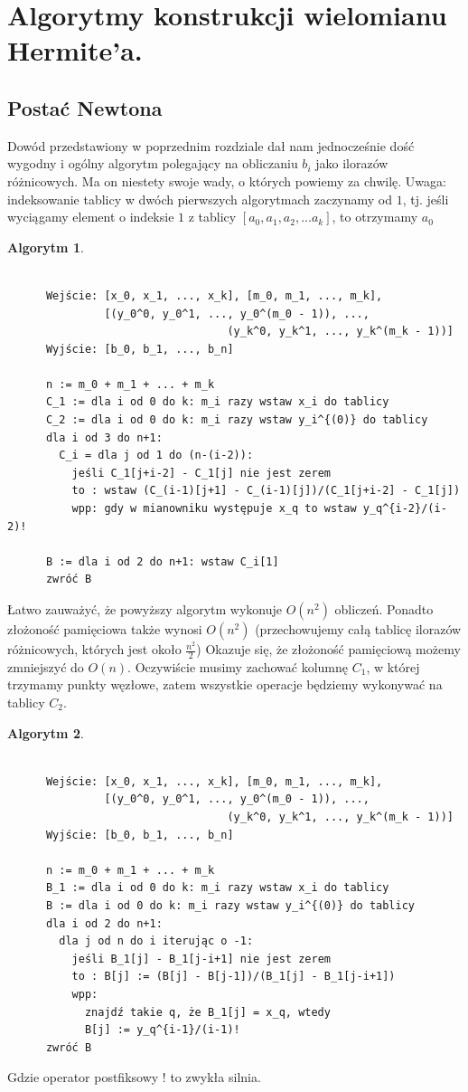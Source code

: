 \documentclass[10pt,wide]{mwart}
\theoremstyle{definition}
\newtheorem{alg}{Algorytm}
\begin{document}
 \section{Algorytmy konstrukcji wielomianu Hermite'a.}
 \subsection{Postać Newtona}
 Dowód przedstawiony w poprzednim rozdziale dał nam jednocześnie dość wygodny i ogólny algorytm polegający na obliczaniu \(b_i\) jako ilorazów różnicowych.
 Ma on niestety swoje wady, o których powiemy za chwilę.
 Uwaga: indeksowanie tablicy w dwóch pierwszych algorytmach zaczynamy od \(1\), tj. jeśli wyciągamy element o indeksie \(1\) z tablicy \([a_0, a_1, a_2, ... a_k]\), to otrzymamy \(a_0\)
\begin{alg}
  \begin{verbatim}

      Wejście: [x_0, x_1, ..., x_k], [m_0, m_1, ..., m_k],
               [(y_0^0, y_0^1, ..., y_0^(m_0 - 1)), ...,
                                  (y_k^0, y_k^1, ..., y_k^(m_k - 1))]
      Wyjście: [b_0, b_1, ..., b_n]

      n := m_0 + m_1 + ... + m_k
      C_1 := dla i od 0 do k: m_i razy wstaw x_i do tablicy
      C_2 := dla i od 0 do k: m_i razy wstaw y_i^{(0)} do tablicy
      dla i od 3 do n+1:
        C_i = dla j od 1 do (n-(i-2)):
          jeśli C_1[j+i-2] - C_1[j] nie jest zerem
          to : wstaw (C_(i-1)[j+1] - C_(i-1)[j])/(C_1[j+i-2] - C_1[j])
          wpp: gdy w mianowniku występuje x_q to wstaw y_q^{i-2}/(i-2)!

      B := dla i od 2 do n+1: wstaw C_i[1]
      zwróć B
\end{verbatim}
\end{alg}
Łatwo zauważyć, że powyższy algorytm wykonuje \(O(n^2)\) obliczeń. Ponadto złożoność pamięciowa także wynosi \(O(n^2)\) (przechowujemy całą tablicę ilorazów różnicowych, których jest około \(\frac{n^2}{2}\))
Okazuje się, że złożoność pamięciową możemy zmniejszyć do \(O(n)\). Oczywiście musimy zachować kolumnę \(C_1\), w której trzymamy punkty węzłowe, zatem wszystkie operacje będziemy wykonywać na tablicy \(C_2\).
\begin{alg}
  \begin{verbatim}

      Wejście: [x_0, x_1, ..., x_k], [m_0, m_1, ..., m_k],
               [(y_0^0, y_0^1, ..., y_0^(m_0 - 1)), ...,
                                  (y_k^0, y_k^1, ..., y_k^(m_k - 1))]
      Wyjście: [b_0, b_1, ..., b_n]

      n := m_0 + m_1 + ... + m_k
      B_1 := dla i od 0 do k: m_i razy wstaw x_i do tablicy
      B := dla i od 0 do k: m_i razy wstaw y_i^{(0)} do tablicy
      dla i od 2 do n+1:
        dla j od n do i iterując o -1:
          jeśli B_1[j] - B_1[j-i+1] nie jest zerem
          to : B[j] := (B[j] - B[j-1])/(B_1[j] - B_1[j-i+1])
          wpp:
            znajdź takie q, że B_1[j] = x_q, wtedy
            B[j] := y_q^{i-1}/(i-1)!
      zwróć B
\end{verbatim}
\end{alg}
Gdzie operator postfiksowy ! to zwykła silnia.
\end{document}
